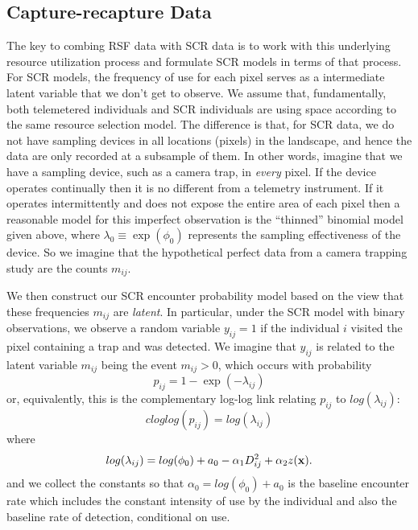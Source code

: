 \subsection{Capture-recapture Data}

The key to combing RSF data with SCR data is to work with this
underlying resource utilization process and formulate SCR models in
terms of that process. For SCR models, the frequency of use for each
pixel serves as a intermediate latent variable that we don't get to
observe. We assume that, fundamentally, both telemetered individuals
and SCR individuals are using space according to the same resource
selection model. The difference is that, for SCR data, we do not have
sampling devices in all locations (pixels) in the landscape, and hence
the data are only recorded at a subsample of them.  In other words,
imagine that we have a sampling device, such as a camera trap, in {\it
  every} pixel. If the device operates continually then it is no
different from a telemetry instrument.  If it operates intermittently
and does not expose the entire area of each pixel then a reasonable
model for this imperfect observation is the ``thinned'' binomial model
given above, where $\lambda_{0} \equiv \exp(\phi_{0})$ represents the
sampling effectiveness of the device. So we imagine that the
hypothetical perfect data from a camera trapping study are the counts
$m_{ij}$.

We then construct our SCR encounter probability model based on the
view that these frequencies $m_{ij}$ are {\it latent}. In particular,
under the SCR model with binary observations,
 we observe a random variable
$y_{ij} = 1$  if the individual $i$ visited the pixel
containing a trap and was detected.
We imagine that $y_{ij}$ is related to the latent variable $m_{ij}$ being the
event $m_{ij}>0$, which occurs with probability
\[
 p_{ij} = 1-\exp(- \lambda_{ij})
\]
or, equivalently, this is the complementary log-log link relating
$p_{ij}$ to $log(\lambda_{ij})$:
\[
 cloglog(p_{ij}) = log(\lambda_{ij})
\]
where
\[
 log(\lambda_{ij}) = log(\phi_{0}) + a_{0} -\alpha_{1} D_{ij}^{2} +  \alpha_{2} z({\bf x}).
\]
and we collect the constants so that $\alpha_{0} = log(\phi_{0}) +
a_{0}$ is the
 baseline encounter rate which includes
the constant intensity of use by the individual and also the baseline
rate of detection, conditional on use.

